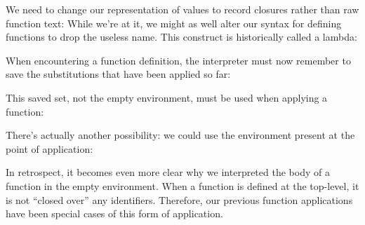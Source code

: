 
We need to change our representation of values to record closures rather than raw
function text:
While we’re at it, we might as well alter our syntax for defining functions to drop
the useless name. This construct is historically called a lambda:

When encountering a function definition, the interpreter must now remember to
save the substitutions that have been applied so far:

This saved set, not the empty environment, must be used when applying a
function:

There’s actually another possibility: we could use the environment present at the
point of application:


In retrospect, it becomes even more clear why we interpreted the body of a
function in the empty environment. When a function is defined at the top-level,
it is not “closed over” any identifiers. Therefore, our previous function
applications have been special cases of this form of application.

